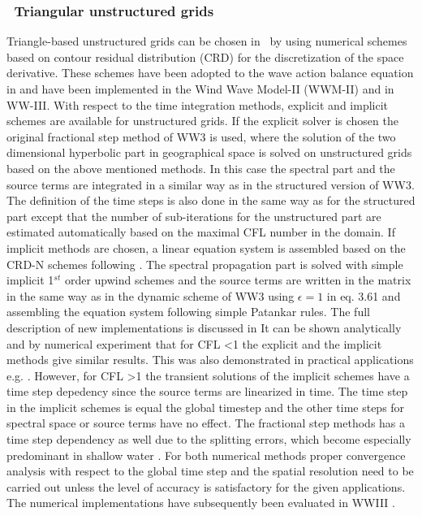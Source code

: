 \vssub
\subsubsection{~Triangular unstructured grids} \label{sub:num_space_tri}

\noindent
Triangle-based unstructured grids can be chosen in \ws\ by using
numerical schemes based on contour residual distribution (CRD)
\citep{art:ricchiuto2005} for the discretization of the space
derivative. These schemes have been adopted to the wave action
balance equation in \citep{rep:Roland2008} and have been
implemented in the Wind Wave Model-II (WWM-II) and in WW-III.
With respect to the time integration methods, explicit
and implicit schemes are available for unstructured grids.
If the explicit solver is chosen the original fractional step
method of WW3 is used, where the solution of the two dimensional
hyperbolic part in geographical space is solved on unstructured
grids based on the above mentioned methods. In this case the
spectral part and the source terms are integrated in a similar
way as in the structured version of WW3. The definition of the time
steps is also done in the same way as for the structured part except
that the number of sub-iterations for the unstructured part are estimated
automatically based on the maximal CFL number in the domain. If implicit methods
are chosen, a linear equation system is assembled based
on the CRD-N schemes following \citep{rep:Roland2008}.
The spectral propagation part is solved with simple implicit
1$^{st}$ order upwind schemes and the source terms are written  in
the matrix in the same way as in the dynamic
scheme of WW3 using $\epsilon = 1$ in eq. 3.61 and assembling the
equation system following simple Patankar rules. The full description of new implementations is discussed in \cite{rolandetal2019t}
It can be shown analytically and by numerical experiment that
for CFL \textless 1 the explicit and the implicit methods give similar results.
This was also demonstrated in practical applications
e.g. \citep{rep:Abdolalli2018, Smith2018, rep:Abdolalli2019, AbdolaliEtAl2019OM}. However, for CFL \textgreater 1
the transient solutions of the implicit schemes
have a time step depedency since the source terms are linearized
in time. The time step in the implicit schemes is equal the global timestep
and the other time steps for spectral space or source terms have no effect.
The fractional step methods has a time step
dependency as well due to the splitting errors, which become
especially predominant in shallow water \citep{rep:Roland2008}.
For both numerical methods proper convergence analysis with respect
to the global time step and the spatial resolution
need to be carried out unless the level of accuracy is
satisfactory for the given applications. The numerical implementations
have subsequently been evaluated in WWIII \citep[e.g.][]{art:Aea09,art:babanin2011,art:bertin2014,
art:bertin2015,art:dodet2013,art:ferrarin2008,art:ferrarin2013,art:janekovic2015,art:kerr2013,art:liau2011,art:Mea10,art:perrie2018,
art:perrie2013two,pro:rol2006a,pro:rol2006b,art:rol2009,art:rol2012,art:rol2014,art:sikiric2012,art:sikiric2013,art:sikiric2018,
pro:zanke2006}.



